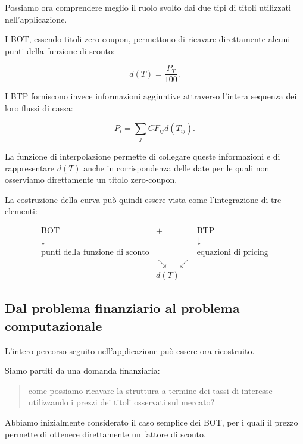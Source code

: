 Possiamo ora comprendere meglio il ruolo svolto dai due tipi di
titoli utilizzati nell'applicazione.

I BOT, essendo titoli zero-coupon, permettono di ricavare
direttamente alcuni punti della funzione di sconto:

\begin{equation*}
    d(T)=\frac{P_T}{100}.
\end{equation*}

I BTP forniscono invece informazioni aggiuntive attraverso
l'intera sequenza dei loro flussi di cassa:

\begin{equation*}
    P_i
    =
    \sum_j CF_{ij}d(T_{ij}).
\end{equation*}

La funzione di interpolazione permette di collegare queste
informazioni e di rappresentare $d(T)$ anche in corrispondenza
delle date per le quali non osserviamo direttamente un titolo
zero-coupon.

La costruzione della curva può quindi essere vista come
l'integrazione di tre elementi:

\begin{equation*}
\begin{array}{ccc}
\text{BOT}
&
+
&
\text{BTP}\\[1mm]
\downarrow&&\downarrow\\
\text{punti della funzione di sconto}
&&
\text{equazioni di pricing}\\[2mm]
&\searrow\quad\swarrow&\\[-1mm]
&d(T)&
\end{array}
\end{equation*}


\subsection{Dal problema finanziario al problema computazionale}

L'intero percorso seguito nell'applicazione può essere ora
ricostruito.

Siamo partiti da una domanda finanziaria:

\begin{quote}
come possiamo ricavare la struttura a termine dei tassi di interesse
utilizzando i prezzi dei titoli osservati sul mercato?
\end{quote}

Abbiamo inizialmente considerato il caso semplice dei BOT, per i
quali il prezzo permette di ottenere direttamente un fattore di
sconto.

